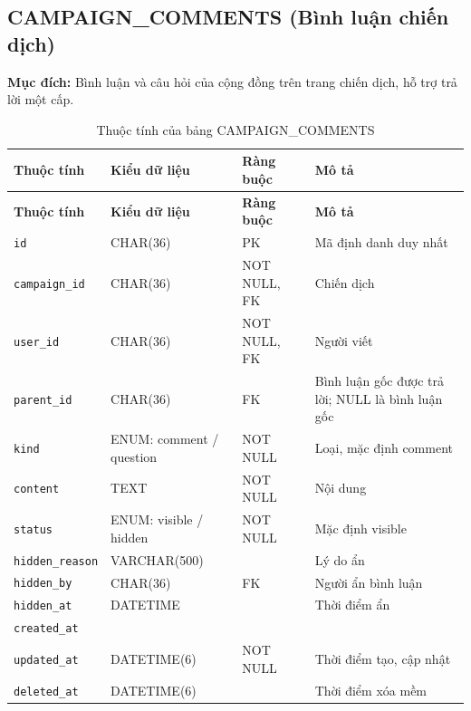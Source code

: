 \subsection{CAMPAIGN\_\allowbreak{}COMMENTS (Bình luận chiến dịch)}

\textbf{Mục đích:} Bình luận và câu hỏi của cộng đồng trên trang chiến dịch, hỗ trợ trả lời một cấp.

{\small
\begin{longtable}{|P{3.2cm}|P{2.8cm}|P{2.2cm}|p{5.4cm}|}
    \caption{Thuộc tính của bảng CAMPAIGN\_\allowbreak{}COMMENTS}
    \label{tab:campaign_comments} \\
    \hline
    \textbf{Thuộc tính} & \textbf{Kiểu dữ liệu} & \textbf{Ràng buộc} & \textbf{Mô tả} \\
    \hline
    \endfirsthead
    \hline
    \textbf{Thuộc tính} & \textbf{Kiểu dữ liệu} & \textbf{Ràng buộc} & \textbf{Mô tả} \\
    \hline
    \endhead

    \texttt{id} & CHAR(36) & PK & Mã định danh duy nhất \\
    \hline
    \texttt{campaign\_\allowbreak{}id} & CHAR(36) & NOT NULL, FK & Chiến dịch \\
    \hline
    \texttt{user\_\allowbreak{}id} & CHAR(36) & NOT NULL, FK & Người viết \\
    \hline
    \texttt{parent\_\allowbreak{}id} & CHAR(36) & FK & Bình luận gốc được trả lời; NULL là bình luận gốc \\
    \hline
    \texttt{kind} & ENUM: comment / question & NOT NULL & Loại, mặc định comment \\
    \hline
    \texttt{content} & TEXT & NOT NULL & Nội dung \\
    \hline
    \texttt{status} & ENUM: visible / hidden & NOT NULL & Mặc định visible \\
    \hline
    \texttt{hidden\_\allowbreak{}reason} & VARCHAR(500) &  & Lý do ẩn \\
    \hline
    \texttt{hidden\_\allowbreak{}by} & CHAR(36) & FK & Người ẩn bình luận \\
    \hline
    \texttt{hidden\_\allowbreak{}at} & DATETIME &  & Thời điểm ẩn \\
    \hline
    \texttt{created\_\allowbreak{}at} &  &  &  \\
    \hline
    \texttt{updated\_\allowbreak{}at} & DATETIME(6) & NOT NULL & Thời điểm tạo, cập nhật \\
    \hline
    \texttt{deleted\_\allowbreak{}at} & DATETIME(6) &  & Thời điểm xóa mềm \\
    \hline
\end{longtable}
}

